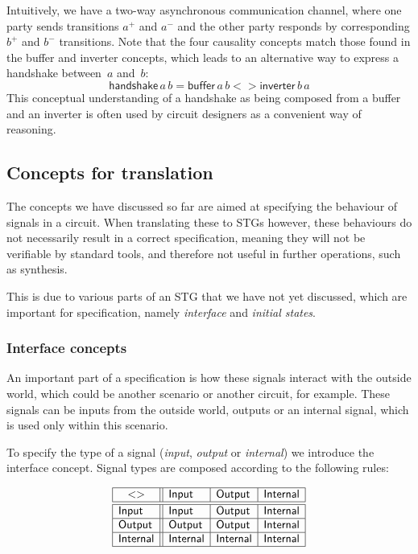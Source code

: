 \documentclass[british,conference,compsoc]{IEEEtran}
\begin{document}
Intuitively, we have a two-way asynchronous communication channel,
where one party sends transitions $a^{+}$ and $a^{-}$ and the other
party responds by corresponding $b^{+}$ and $b^{-}$ transitions.
Note that the four causality concepts match those found
in the buffer and inverter concepts, which leads to an alternative
way to express a handshake between~$a$ and~$b$:
\[
\mathsf{handshake}\,a\, b=\mathsf{buffer}\,a\, b <>\mathsf{inverter}\,b\, a
\]
This conceptual understanding of a handshake as being composed
from a buffer and an inverter is often used by circuit designers as
a convenient way of reasoning.


\subsection{Concepts for translation\label{sub:trans-concepts}}

The concepts we have discussed so far are aimed at specifying the behaviour of 
signals in a circuit. When translating these to STGs however, these behaviours 
do not necessarily result in a correct specification, meaning they will not be 
verifiable by standard tools, and therefore not useful in further operations, 
such as synthesis.

This is due to various parts of an STG that we have not yet discussed, which 
are important for specification, namely \emph{interface} and 
\emph{initial states}.


\subsubsection{Interface concepts\label{sub:interface}} 

An important part of a specification is how these signals interact with the 
outside world, which could be another scenario or another circuit, for example.
These signals can be inputs from the outside world, outputs or an internal 
signal, which is used only within this scenario. 

To specify the type of a signal (\emph{input},
\emph{output} or \emph{internal}) we introduce the \textsf{interface} concept.
Signal types are composed according to the following rules:

\[
\begin{array}{|l||l|l|l|}
\hline
\multicolumn{1}{|c||}{<>} & \mathsf{Input} & \mathsf{Output} &
\mathsf{Internal} \\ \hline \hline
\mathsf{Input} & \mathsf{Input} & \mathsf{Output} & \mathsf{Internal} \\ \hline
\mathsf{Output} & \mathsf{Output} & \mathsf{Output} & \mathsf{Internal} \\
\hline
\mathsf{Internal}& \mathsf{Internal} & \mathsf{Internal} & \mathsf{Internal} \\
\hline
\end{array}
\]
\end{document}
